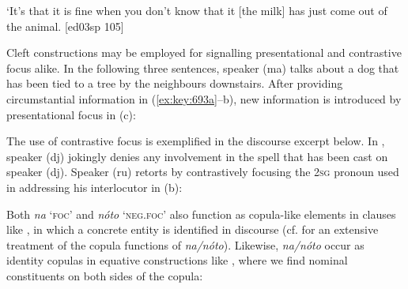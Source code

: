 \glt ‘It’s that it is fine when you don’t know that it [the milk] has just come out of the 
animal. [ed03sp 105]
\z

Cleft constructions may be employed for signalling presentational and contrastive focus alike. In the following three sentences, speaker (ma) talks about a dog that has been tied to a tree by the neighbours downstairs. After providing circumstantial information in (\ref{ex:key:693a}–b), new information is introduced by presentational focus in (c): 


\ea%
    \label{ex:key:693}
\z\z

The use of contrastive focus is exemplified in the discourse excerpt below. In , speaker (dj) jokingly denies any involvement in the spell that has been cast on speaker (dj). Speaker (ru) retorts by contrastively focusing the \textsc{2sg} pronoun used in addressing his interlocutor in (b): 


\ea%
    \label{ex:key:694}
\z\z

Both \textit{na} ‘\textsc{foc}’ and \textit{nóto} ‘\textsc{neg}.\textsc{foc}’ also function as copula-like elements in clauses like , in which a concrete entity is identified in discourse (cf.  for an extensive treatment of the copula functions of \textit{na}\textit{/}\textit{nóto}). Likewise, \textit{na}\textit{/}\textit{nóto} occur as identity copulas in equative constructions like , where we find nominal constituents on both sides of the copula: 

